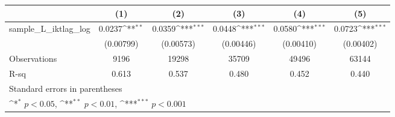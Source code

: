 {
\def\sym#1{\ifmmode^{#1}\else\(^{#1}\)\fi}
\begin{tabular}{l*{5}{c}}
\hline\hline
                &\multicolumn{1}{c}{(1)}         &\multicolumn{1}{c}{(2)}         &\multicolumn{1}{c}{(3)}         &\multicolumn{1}{c}{(4)}         &\multicolumn{1}{c}{(5)}         \\
\hline
sample\_L\_iktlag\_log&   0.0237\sym{**} &   0.0359\sym{***}&   0.0448\sym{***}&   0.0580\sym{***}&   0.0723\sym{***}\\
                &(0.00799)         &(0.00573)         &(0.00446)         &(0.00410)         &(0.00402)         \\
\hline
Observations    &     9196         &    19298         &    35709         &    49496         &    63144         \\
R-sq            &    0.613         &    0.537         &    0.480         &    0.452         &    0.440         \\
\hline\hline
\multicolumn{6}{l}{\footnotesize Standard errors in parentheses}\\
\multicolumn{6}{l}{\footnotesize \sym{*} \(p<0.05\), \sym{**} \(p<0.01\), \sym{***} \(p<0.001\)}\\
\end{tabular}
}
